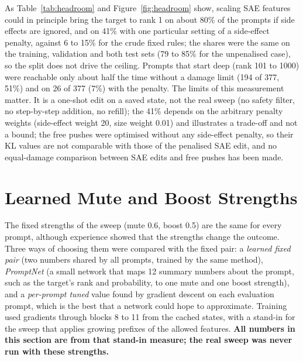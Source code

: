 \documentclass[12pt,a4paper]{report}
\begin{document}
As Table~\ref{tab:headroom} and Figure~\ref{fig:headroom} show, scaling SAE features could in principle bring the target to rank 1 on about 80\% of the prompts if side effects are ignored, and on 41\% with one particular setting of a side-effect penalty, against 6 to 15\% for the crude fixed rules; the shares were the same on the training, validation and both test sets (79 to 85\% for the unpenalised case), so the split does not drive the ceiling. Prompts that start deep (rank 101 to 1000) were reachable only about half the time without a damage limit (194 of 377, 51\%) and on 26 of 377 (7\%) with the penalty. The limits of this measurement matter. It is a one-shot edit on a saved state, not the real sweep (no safety filter, no step-by-step addition, no refill); the 41\% depends on the arbitrary penalty weights (side-effect weight 20, size weight 0.01) and illustrates a trade-off and not a bound; the free pushes were optimised without any side-effect penalty, so their KL values are not comparable with those of the penalised SAE edit, and no equal-damage comparison between SAE edits and free pushes has been made.

\section{Learned Mute and Boost Strengths}\label{sec:learned}

The fixed strengths of the sweep (mute 0.6, boost 0.5) are the same for every prompt, although experience showed that the strengths change the outcome. Three ways of choosing them were compared with the fixed pair: a \textit{learned fixed pair} (two numbers shared by all prompts, trained by the same method), \textit{PromptNet} (a small network that maps 12 summary numbers about the prompt, such as the target's rank and probability, to one mute and one boost strength), and a \textit{per-prompt tuned} value found by gradient descent on each evaluation prompt, which is the best that a network could hope to approximate. Training used gradients through blocks 8 to 11 from the cached states, with a stand-in for the sweep that applies growing prefixes of the allowed features. \textbf{All numbers in this section are from that stand-in measure; the real sweep was never run with these strengths.}
\end{document}
